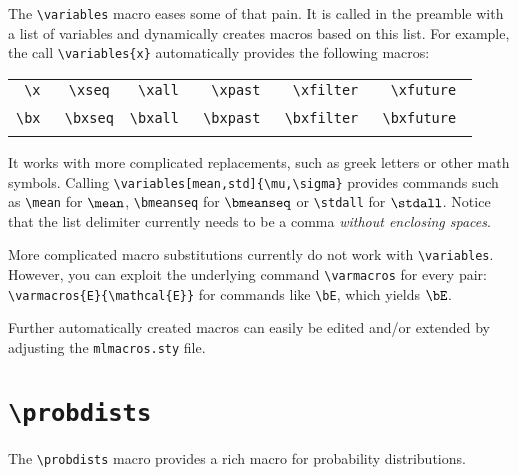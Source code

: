 \documentclass
[
]
{article}
\begin{document}
The \texttt{\textbackslash variables} macro eases some of that pain. It is called in the preamble with a list of variables and dynamically creates macros based on this list. For example, the call \texttt{\textbackslash variables\{x\}} automatically provides the following macros:
\setlength{}
\begin{table}[h!]
	\centering
	\begin{tabular}{cccccc}
		\texttt{\textbackslash x}		   & \texttt{\textbackslash xseq}	& \texttt{\textbackslash xall} & \texttt{\textbackslash xpast} & \texttt{\textbackslash xfilter} &\texttt{\textbackslash xfuture}\\
		\x		   & \xseq	& \xall & \xpast & \xfilter &\xfuture\\
		\texttt{\textbackslash bx	}	   & \texttt{\textbackslash bxseq}	& \texttt{\textbackslash bxall }& \texttt{\textbackslash bxpast }& \texttt{\textbackslash bxfilter }&\texttt{\textbackslash bxfuture } \\
		\bx		   & \bxseq	& \bxall & \bxpast & \bxfilter &\bxfuture
	\end{tabular}
\end{table}
\setlength{}
\newline It works with more complicated replacements, such as greek letters or other math symbols. 
Calling \texttt{\textbackslash variables[mean,std]\{\textbackslash mu,\textbackslash sigma\}} provides commands such as \texttt{\textbackslash mean} for $\mean$, \texttt{\textbackslash bmeanseq} for $\bmeanseq$ or \texttt{\textbackslash stdall} for $\stdall$.
Notice that the list delimiter currently needs to be a comma \emph{without enclosing spaces}.

More complicated macro substitutions currently do not work with \texttt{\textbackslash variables}. However, you can exploit the underlying command \texttt{\textbackslash varmacros} for every pair: \texttt{\textbackslash varmacros\{E\}\{\textbackslash mathcal\{E\}\}} for commands like \texttt{\textbackslash bE}, which yields $\bE$.

Further automatically created macros can easily be edited and/or extended by adjusting the \texttt{mlmacros.sty} file.


\section{\texttt{\textbackslash probdists}}\label{sec:probdists}
The \texttt{\textbackslash probdists} macro provides a rich macro for probability distributions.
\end{document}
